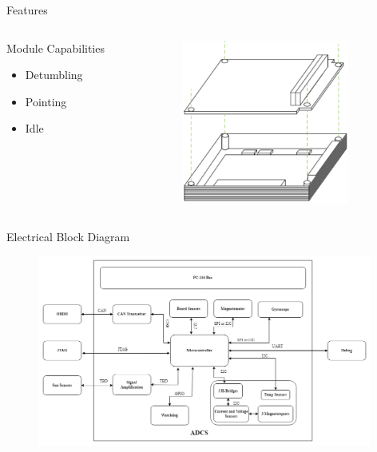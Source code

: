 \documentclass{beamer}
\begin{document}
\begin{frame}{Features}
    \begin{columns}[t]
        \begin{column}[t]{0.5\textwidth}
        \item Module Capabilities
        \vspace{0.3cm}
            \begin{itemize}
                \item Detumbling
                \vspace{0.3cm}
                \item Pointing
                \vspace{0.3cm}
                \item Idle
                \vspace{0.3cm}
            \end{itemize}
        \end{column}
        \begin{column}[t]{0.5\textwidth}
            \begin{figure}[!ht]
                \begin{center}
                    \includegraphics[width=5.5cm]{figures/adcs-module-idea.png}
                \end{center}
            \end{figure}
        \end{column}
    \end{columns}
\end{frame}

\begin{frame}{Electrical Block Diagram}

    \begin{figure}[!ht]
        \begin{center}
            \includegraphics[width=11cm]{figures/ADCS.drawio (2).png}
        \end{center}
    \end{figure}

\end{frame}
\end{document}
